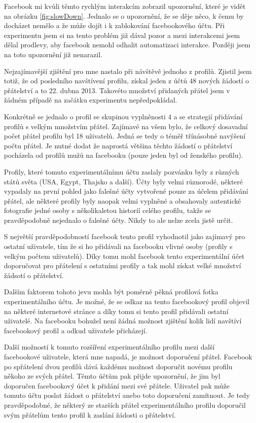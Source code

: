 \documentclass[thesis=M,czech]{FITthesis}[2013/05/10]
\begin{document}
Facebook mi kvůli těmto rychlým interakcím zobrazil upozornění, které je vidět na obrázku \ref{fig:slowDown}. Jednalo se o upozornění, že se děje něco, k čemu by docházet nemělo a že může dojít i k zablokování facebookového účtu. Při experimentu jsem si na tento problém již dával pozor a mezi interakcemi jsem dělal prodlevy, aby facebook nemohl odhalit automatizaci interakce. Později jsem na toto upozornění již nenarazil.

Nejzajímavější zjištění pro mne nastalo při návštěvě jednoho z profilů. Zjistil jsem totiž, že od posledního navštívení profilu, získal jeden z účtů 48 nových žádostí o přátelství a to 22. dubna 2013. Takovéto množství přidaných přátel jsem v žádném případě na začátku experimentu nepředpokládal.

Konkrétně se jednalo o profil se skupinou vyplněnosti 4 a se strategií přidávání profilů s velkým množstvím přátel. Zajímavé na všem bylo, že celkový dosavadní počet přátel profilu byl 18 uživatelů. Jedná se tedy o téměř třínásobné navýšení počtu přátel. Je nutné dodat že naprostá většina těchto žádostí o přátelství pocházela od profilů mužů na facebooku (pouze jeden byl od ženského profilu).

Profily, které tomuto experimentálnímu účtu zaslaly pozvánku byly z různých států světa (USA, Egypt, Thajsko a další). Účty byly velmi různorodé, některé vypadaly na první pohled jako falešné účty vytvořené pouze za účelem přidávání přátel, ale některé profily byly naopak velmi vyplněné a obsahovaly autentické fotografie jedné osoby s několikaletou historíí celého profilu, takže se pravděpodobně nejednalo o falešné účty. Nikdy to ale nelze zcela jistě určit. 

S největší pravděpodobností facebook tento profil vyhodnotil jako zajímavý pro ostatní uživatele, tím že si ho přidávali na facebooku vlivné osoby (profily s velkým počtem uživatelů). Díky tomu mohl facebook tento experimentální účet doporučovat pro přátelení s ostatními profily a tak mohl získat velké množství žádsotí o přátelství.

Dalším faktorem tohoto jevu mohla být poměrně pěkná profilová fotka experimentálního účtu. Je možné, že se odkaz na tento facebookový profil objevil na některé internetové stránce a díky tomu si tento profil přidávali ostatní uživatelé. Na facebooku bohužel není žádná možnost zjištění kolik lidí navštíví facebookový profil a odkud uživatele přicházejí.

Další možností k tomuto rozšíření experimentálního profilu mezi další facebookové uživatele, která mne napadá, je možnost doporučení přátel. Facebook po spřátelení dvou profilů dává každému možnost doporučit novému profilu někoho ze svých přátel. Těmto účtům pak přijde upozornění, že jim byl doporučen facebookový  účet k přidání mezi své přátele. Uživatel pak může tomuto účtu poslat žádost o přátelství anebo toto doporučení zamítnout. Je tedy pravděpodobné, že některý ze starších přátel experimentálního profilu doporučil svým přátelům tento profil k zaslání žádosti o přátelství. 
\end{document}
